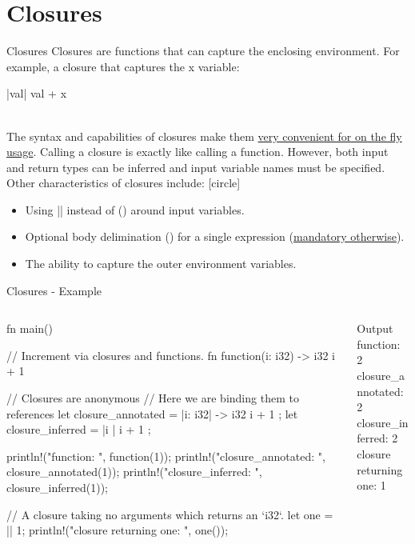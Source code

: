 \documentclass[10pt,xcolor={dvipsnames}, aspectratio=169]{beamer}
\begin{document}
\section{Closures}
    \begin{frame}[fragile]{Closures}
        Closures are functions that can capture the enclosing environment. For example, a closure that captures the x variable:
	        \begin{rustcode}
|val| val + x
        \end{rustcode}
        ~\\The syntax and capabilities of closures make them \ul{very convenient for on the fly usage}. Calling a closure is exactly like calling a function. However, both input and return types can be inferred and input variable names must be specified.
        ~\\Other characteristics of closures include:
        [circle]
        \begin{itemize}
            \item Using || instead of () around input variables.
            \item Optional body delimination ({}) for a single expression (\ul{mandatory otherwise}).
            \item The ability to capture the outer environment variables.
        \end{itemize}
    \end{frame}
    
    \begin{frame}[fragile]{Closures - Example}
        \begin{columns}[T]
			\begin{column}{0.6 \textwidth}
    	        \begin{rustcode}
fn main() {
    // Increment via closures and functions.
    fn function(i: i32) -> i32 { i + 1 }

    // Closures are anonymous
    // Here we are binding them to references
    let closure_annotated = |i: i32| -> i32 { i + 1 };
    let closure_inferred  = |i     |          i + 1  ;

    println!("function: {}", function(1));
    println!("closure_annotated: {}", closure_annotated(1));
    println!("closure_inferred: {}", closure_inferred(1));

    // A closure taking no arguments which returns an `i32`.
    let one = || 1;
    println!("closure returning one: {}", one());}
                \end{rustcode}
			\end{column}
			\begin{column}{0.4 \textwidth}
				\begin{block}{Output}
					function: 2\\
                    closure\_annotated: 2\\
                    closure\_inferred: 2\\
                    closure returning one: 1
				\end{block}
			\end{column}
		\end{columns}
    \end{frame}
\end{document}
